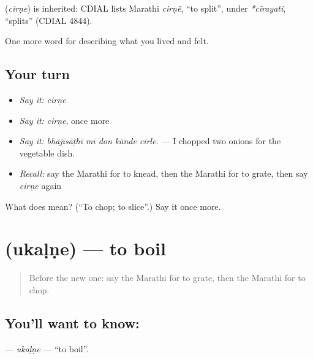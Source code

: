 \begin{cousinweb}
\textbf{} (\emph{cirṇe}) is inherited: CDIAL lists Marathi \emph{cirṇẽ}, \textquotedblleft{}to split\textquotedblright{}, under \emph{*cīrayati}, \textquotedblleft{}splits\textquotedblright{} (CDIAL 4844).
\end{cousinweb}

\begin{grammarlens}[title={What you've built}]
One more word for describing what you lived and felt.
\end{grammarlens}

\subsection*{Your turn}
\begin{itemize}
\raggedright
  \item \emph{Say it:} \emph{cirṇe}
  \item \emph{Say it:} \emph{cirṇe}, once more
  \item \emph{Say it:} \emph{bhājīsāṭhī mī don kānde cirle.} — I chopped two onions for the vegetable dish.
  \item \emph{Recall:} say the Marathi for to knead, then the Marathi for to grate, then say \emph{cirṇe} again
\end{itemize}

\begin{tcolorbox}[breakable,colback=teal!4,colframe=teal!35!black,title={Before you move on}]
What does  mean? (\textquotedblleft{}To chop; to slice\textquotedblright{}.) Say it once more.
\end{tcolorbox}
\section[\texorpdfstring{\mr{उकळणे} (ukaḷṇe)}{उकळणे (ukaḷṇe)}]{ (ukaḷṇe) — to boil}

\label{lesson:MR-C527-ukalne-boil}



\begin{quote}
Before the new one: say the Marathi for to grate, then the Marathi for to chop.
\end{quote}

\subsection*{You'll want to know: }
\textbf{} — \emph{ukaḷṇe} — \textquotedblleft{}to boil\textquotedblright{}.

